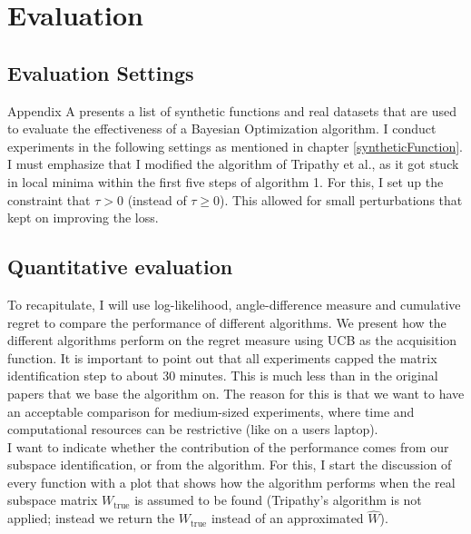 \chapter{Evaluation}

\ifpdf
    \graphicspath{{07_Chapter6/Figs/Raster/}{07_Chapter6/Figs/PDF/}{07_Chapter6/Figs/}}
\else
    \graphicspath{{07_Chapter6/Figs/Vector/}{07_Chapter6/Figs/}}
\fi

\section{Evaluation Settings}

Appendix A presents a list of synthetic functions and real datasets that are used to evaluate the effectiveness of a Bayesian Optimization algorithm. 
I conduct experiments in the following settings as mentioned in chapter \ref{syntheticFunction}.
I must emphasize that I modified the algorithm of Tripathy et al., as it got stuck in local minima within the first five steps of algorithm 1.
For this, I set up the constraint that $\tau > 0$ (instead of $\tau \geq 0$). 
This allowed for small perturbations that kept on improving the loss.

\section{Quantitative evaluation}
To recapitulate, I will use log-likelihood, angle-difference measure and cumulative regret to compare the performance of different algorithms.
We present how the different algorithms perform on the regret measure using UCB as the acquisition function.
It is important to point out that all experiments capped the matrix identification step to about 30 minutes.
This is much less than in the original papers that we base the algorithm on.
The reason for this is that we want to have an acceptable comparison for medium-sized experiments, where time and computational resources can be restrictive (like on a users laptop). \\

I want to indicate whether the contribution of the performance comes from our subspace identification, or from the algorithm. 
For this, I start the discussion of every function with a plot that shows how the algorithm performs when the real subspace matrix $W_{\text{true}}$ is assumed to be found (Tripathy's algorithm is not applied; instead we return the $W_{\text{true}}$ instead of an approximated $\hat{W}$). \\

